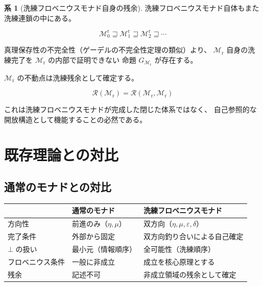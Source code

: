 \documentclass[11pt,a4paper]{article}
\theoremstyle{definition}
\newtheorem{corollary}{系}[section]
\newcommand{\Mr}{\mathcal{M}_{\mathrm{r}}}
\begin{document}
\begin{corollary}[洗練フロベニウスモナド自身の残余]
洗練フロベニウスモナド自体もまた洗練連鎖の中にある。

\begin{equation}
\mathcal{M}^{\mathrm{r}}_0 \sqsupseteq \mathcal{M}^{\mathrm{r}}_1 \sqsupseteq \mathcal{M}^{\mathrm{r}}_2 \sqsupseteq \cdots
\end{equation}

真理保存性の不完全性（ゲーデルの不完全性定理の類似）より、
$\Mr$ 自身の洗練完了を $\Mr$ の内部で証明できない
命題 $G_{\Mr}$ が存在する。

$\Mr$ の不動点は洗練残余として確定する。

\begin{equation}
\mathcal{R}(\Mr) = \mathcal{R}(\Mr, \Mr)
\end{equation}

これは洗練フロベニウスモナドが完成した閉じた体系ではなく、
自己参照的な開放構造として機能することの必然である。
\end{corollary}

\section{既存理論との対比}

\subsection{通常のモナドとの対比}

\begin{center}
\begin{tabular}{lll}
\hline
& \textbf{通常のモナド} & \textbf{洗練フロベニウスモナド} \\
\hline
方向性 & 前進のみ（$\eta, \mu$） & 双方向（$\eta, \mu, \varepsilon, \delta$） \\
完了条件 & 外部から固定 & 双方向釣り合いによる自己確定 \\
$\bot$ の扱い & 最小元（情報順序） & 全可能性（洗練順序） \\
フロベニウス条件 & 一般に非成立 & 成立を核心原理とする \\
残余 & 記述不可 & 非成立領域の残余として確定 \\
\hline
\end{tabular}
\end{center}
\end{document}
